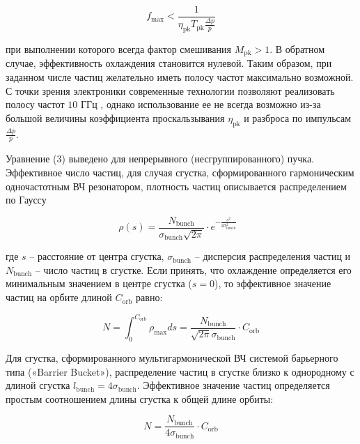 \begin{equation}
f_{\textrm{max}}<\frac{1}{\eta_{\textrm{pk}}T_{\textrm{pk}}\frac{\Delta p}{p}}
\end{equation}	

\noindent при выполнении которого всегда фактор смешивания $M_{\textrm{pk}}>1$. В обратном случае, эффективность охлаждения становится нулевой. Таким образом, при заданном числе частиц желательно иметь полосу частот максимально возможной. С точки зрения электроники современные технологии позволяют реализовать полосу частот $10$ ГГц \cite{caspers:stochastic}, однако использование ее не всегда возможно из-за большой величины коэффициента проскальзывания $\eta_{\textrm{pk}}$ и разброса по импульсам $\frac{\Delta p}{p}$.

\noindent Уравнение (3) выведено для непрерывного (несгруппированного) пучка.  Эффективное число частиц, для случая сгустка, сформированного гармоническим одночастотным ВЧ резонатором, плотность частиц описывается распределением по Гауссу

\begin{equation}
\rho(s)=\frac{N_{\textrm{bunch}}}{\sigma_{\textrm{bunch}}\sqrt{2\pi}}\cdot e^{-\frac{s^2}{2\sigma_{\textrm{bunch}}^2}}\ \ \ 
\end{equation}	

\noindent где $s$ – расстояние от центра сгустка, $\sigma_{\textrm{bunch}}$ – дисперсия распределения частиц и $N_{\textrm{bunch}}$ – число частиц в сгустке. Если принять, что охлаждение определяется его минимальным значением в центре сгустка ($s=0$), то эффективное значение частиц на орбите длиной $C_{\textrm{orb}}$ равно:

\begin{equation}
N=\int_{0}^{C_{\textrm{orb}}}{\rho_{\textrm{max}}ds}=\frac{N_{\textrm{bunch}}}{\sqrt{2\pi}\sigma_{\textrm{bunch}}}\cdot C_{\textrm{orb}}
\end{equation}

\noindent Для сгустка, сформированного мультигармонической ВЧ системой барьерного типа («Barrier Bucket»), распределение частиц в сгустке близко к однородному с длиной сгустка $l_{\textrm{bunch}}=4\sigma_{\textrm{bunch}}$. Эффективное значение частиц определяется простым соотношением длины сгустка к общей длине орбиты:

\begin{equation}
N=\frac{N_{\textrm{bunch}}}{{4\sigma}_{\textrm{bunch}}}\cdot C_{\textrm{orb}}
\end{equation}

